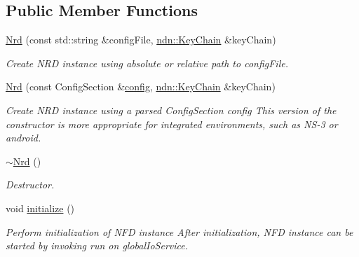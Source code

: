 \subsection*{Public Member Functions}
\begin{DoxyCompactItemize}
\item 
\hyperlink{classnfd_1_1rib_1_1Nrd_a63fbb0f5fa0a3ce17d10ab15f1a56d2a}{Nrd} (const std\+::string \&config\+File, \hyperlink{classndn_1_1security_1_1KeyChain}{ndn\+::\+Key\+Chain} \&key\+Chain)\hypertarget{classnfd_1_1rib_1_1Nrd_a63fbb0f5fa0a3ce17d10ab15f1a56d2a}{}\label{classnfd_1_1rib_1_1Nrd_a63fbb0f5fa0a3ce17d10ab15f1a56d2a}

\begin{DoxyCompactList}\small\item\em Create N\+RD instance using absolute or relative path to {\ttfamily config\+File}. \end{DoxyCompactList}\item 
\hyperlink{classnfd_1_1rib_1_1Nrd_a0ce62bd0c85c6b2d776b26dd341a47b8}{Nrd} (const Config\+Section \&\hyperlink{classconfig}{config}, \hyperlink{classndn_1_1security_1_1KeyChain}{ndn\+::\+Key\+Chain} \&key\+Chain)
\begin{DoxyCompactList}\small\item\em Create N\+RD instance using a parsed Config\+Section {\ttfamily config} This version of the constructor is more appropriate for integrated environments, such as N\+S-\/3 or android. \end{DoxyCompactList}\item 
\hyperlink{classnfd_1_1rib_1_1Nrd_a0c7f7cde09a1932ac12542191c9b1326}{$\sim$\+Nrd} ()\hypertarget{classnfd_1_1rib_1_1Nrd_a0c7f7cde09a1932ac12542191c9b1326}{}\label{classnfd_1_1rib_1_1Nrd_a0c7f7cde09a1932ac12542191c9b1326}

\begin{DoxyCompactList}\small\item\em Destructor. \end{DoxyCompactList}\item 
void \hyperlink{classnfd_1_1rib_1_1Nrd_acd2d364ad2b111e41e823cebb4b82cae}{initialize} ()\hypertarget{classnfd_1_1rib_1_1Nrd_acd2d364ad2b111e41e823cebb4b82cae}{}\label{classnfd_1_1rib_1_1Nrd_acd2d364ad2b111e41e823cebb4b82cae}

\begin{DoxyCompactList}\small\item\em Perform initialization of N\+FD instance After initialization, N\+FD instance can be started by invoking run on global\+Io\+Service. \end{DoxyCompactList}\end{DoxyCompactItemize}


